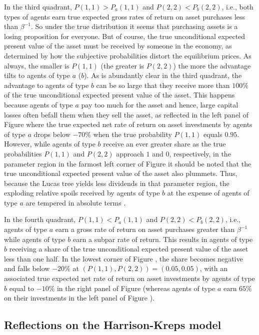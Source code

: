 In the third quadrant, $P(1,1)>P_a(1,1)$ and 
$P(2,2)<P_b(2,2)$, i.e., both types of agents
earn true expected gross rates of return on asset 
purchases less than $\beta^{-1}$. So under the true distribution
 it seems that purchasing assets is 
a losing proposition for everyone. But of course, 
the true unconditional expected present value of
the asset must be received by someone in the
economy, as determined by how the subjective
probabilities distort the equilibrium prices.
As always, the smaller is $P(1,1)$ (the greater is
$P(2,2)$) the more the advantage  tilts to agents 
of type $a$ ($b$). As is abundantly clear 
in the third quadrant, the advantage to agents 
of type $b$ can be so large that they receive 
more than $100\%$ of the true unconditional 
expected present value of the asset.
This happens because agents of type $a$ 
pay too much for  the 
asset and hence, large capital losses 
often befall them when they sell the
asset, as reflected in the left panel of
Figure  where the true expected net 
rate of return on asset investments by agents 
of type $a$ drops below $-70\%$ when the true 
probability $P(1,1)$ equals $0.95$. However, 
while agents of type $b$ receive an ever greater 
share as the true probabilities $P(1,1)$ and 
$P(2,2)$ approach $1$ and $0$, respectively,  
in the parameter region in 
the farmost left corner of Figure 
it should be noted that the true unconditional
expected present value of the asset  also plummets. Thus, because
 the Lucas tree yields
less dividends in that parameter region, the exploding 
relative spoils received by agents of type $b$ 
at the expense of agents of type $a$ are tempered
in absolute terms .

In the fourth quadrant, $P(1,1)<P_a(1,1)$ and 
$P(2,2)<P_b(2,2)$, i.e., agents of type $a$ earn 
a gross rate of return on asset purchases greater 
than $\beta^{-1}$ while agents of type $b$ earn a 
subpar rate of return. This results in agents of 
type $b$ receiving a share of the true unconditional 
expected present value of the asset less than one 
half. In the lowest corner of Figure ,
the share becomes negative and falls below 
$-20\%$ at $(P(1,1),P(2,2))=(0.05,0.05)$, with an  
associated true expected net rate of return on asset 
investments by agents of type $b$ equal to $-10\%$ in 
the right panel of Figure  (whereas
agents of type $a$ earn $65\%$ on their
investments in the left panel of Figure ).


\subsection{Reflections on the Harrison-Kreps model}

